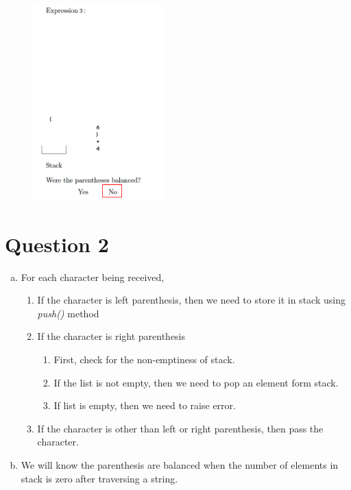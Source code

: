 \documentclass[12pt]{article}
\begin{document}
\begin{figure}[h!]
    \includegraphics[width=0.45\textwidth]{images/worksheet_9_q1c_solution.png}\hfill
\end{figure}

\newpage

\section*{Question 2}
\begin{enumerate}[a.]
    \item

    For each character being received,

    \begin{enumerate}[1.]
        \item If the character is left parenthesis, then we need to store it in stack using \textit{push()} method
        \item If the character is right parenthesis
        \begin{enumerate}[1.]
            \item First, check for the non-emptiness of stack.
            \item If the list is not empty, then we need to pop an element form stack.
            \item If list is empty, then we need to raise error.
        \end{enumerate}
        \item If the character is other than left or right parenthesis, then pass the character.
    \end{enumerate}

    \item We will know the parenthesis are balanced when the number of elements
    in stack is zero after traversing a string.
\end{enumerate}
\end{document}
